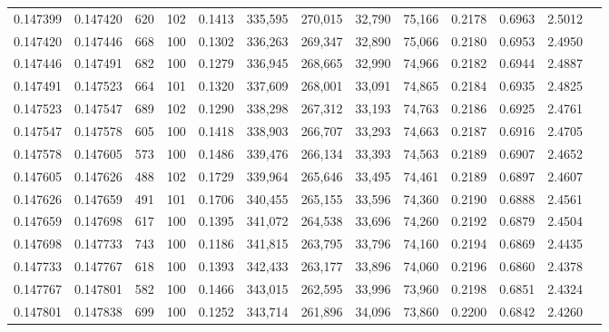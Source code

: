 \begin{tabular}{rrrrrrrrrrrrr}
0.147399 & 0.147420 &   620 & 102 &                                     0.1413 & 335,595 & 270,015 &  32,790 &  75,166 & 0.2178 & 0.6963 & 2.5012 \\
0.147420 & 0.147446 &   668 & 100 &                                     0.1302 & 336,263 & 269,347 &  32,890 &  75,066 & 0.2180 & 0.6953 & 2.4950 \\
0.147446 & 0.147491 &   682 & 100 &                                     0.1279 & 336,945 & 268,665 &  32,990 &  74,966 & 0.2182 & 0.6944 & 2.4887 \\
0.147491 & 0.147523 &   664 & 101 &                                     0.1320 & 337,609 & 268,001 &  33,091 &  74,865 & 0.2184 & 0.6935 & 2.4825 \\
0.147523 & 0.147547 &   689 & 102 &                                     0.1290 & 338,298 & 267,312 &  33,193 &  74,763 & 0.2186 & 0.6925 & 2.4761 \\
0.147547 & 0.147578 &   605 & 100 &                                     0.1418 & 338,903 & 266,707 &  33,293 &  74,663 & 0.2187 & 0.6916 & 2.4705 \\
0.147578 & 0.147605 &   573 & 100 &                                     0.1486 & 339,476 & 266,134 &  33,393 &  74,563 & 0.2189 & 0.6907 & 2.4652 \\
0.147605 & 0.147626 &   488 & 102 &                                     0.1729 & 339,964 & 265,646 &  33,495 &  74,461 & 0.2189 & 0.6897 & 2.4607 \\
0.147626 & 0.147659 &   491 & 101 &                                     0.1706 & 340,455 & 265,155 &  33,596 &  74,360 & 0.2190 & 0.6888 & 2.4561 \\
0.147659 & 0.147698 &   617 & 100 &                                     0.1395 & 341,072 & 264,538 &  33,696 &  74,260 & 0.2192 & 0.6879 & 2.4504 \\
0.147698 & 0.147733 &   743 & 100 &                                     0.1186 & 341,815 & 263,795 &  33,796 &  74,160 & 0.2194 & 0.6869 & 2.4435 \\
0.147733 & 0.147767 &   618 & 100 &                                     0.1393 & 342,433 & 263,177 &  33,896 &  74,060 & 0.2196 & 0.6860 & 2.4378 \\
0.147767 & 0.147801 &   582 & 100 &                                     0.1466 & 343,015 & 262,595 &  33,996 &  73,960 & 0.2198 & 0.6851 & 2.4324 \\
0.147801 & 0.147838 &   699 & 100 &                                     0.1252 & 343,714 & 261,896 &  34,096 &  73,860 & 0.2200 & 0.6842 & 2.4260 \\

\end{tabular}
